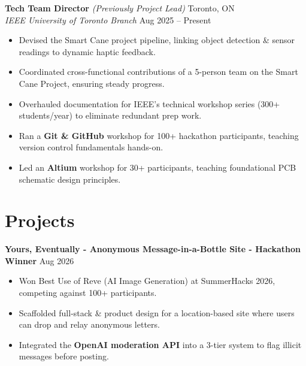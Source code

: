 \documentclass[10pt,letterpaper]{article}
\begin{document}
\vspace{0.25em}
\textbf{Tech Team Director} \textit{(Previously Project Lead)} \hfill 
Toronto, ON \\
\textit{IEEE University of Toronto Branch} \hfill
Aug 2025 -- Present \\
\begin{itemize}
    \item Devised the Smart Cane project pipeline, linking object detection \& sensor readings to dynamic haptic feedback. 
    \item Coordinated cross-functional contributions of a 5-person team on the Smart Cane Project, ensuring steady progress. 
    \item Overhauled documentation for IEEE's technical workshop series (300+ students/year) to eliminate redundant prep work.
    \item Ran a \textbf{Git \& GitHub} workshop for 100+ hackathon participants, teaching version control fundamentals hands-on.
    \item Led an \textbf{Altium} workshop for 30+ participants, teaching foundational PCB schematic design principles.
\end{itemize}




\section{Projects}

\textbf{Yours, Eventually - Anonymous Message-in-a-Bottle Site - Hackathon Winner} \hfill Aug 2026 \\
\begin{itemize}
    \item Won Best Use of Reve (AI Image Generation) at SummerHacks 2026, competing against 100+ participants.
    \item Scaffolded full-stack \& product design for a location-based site where users can drop and relay anonymous letters.
    \item Integrated the \textbf{OpenAI moderation API} into a 3-tier system to flag illicit messages before posting.
\end{itemize}
\end{document}
